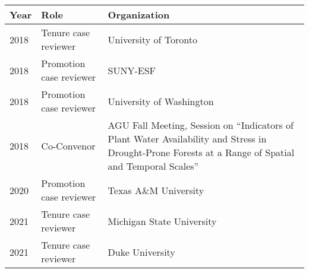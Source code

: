 
\begin{longtable}{llp{12cm}}
Year & Role & Organization\\
\hline 
\endhead 
2018 & Tenure case reviewer & University of Toronto \\
2018 & Promotion case reviewer & SUNY-ESF \\
2018 & Promotion case reviewer & University of Washington \\
2018 & Co-Convenor & AGU Fall Meeting, Session on ``Indicators of Plant Water Availability and Stress in Drought-Prone Forests at a Range of Spatial and Temporal Scales'' \\
2020 & Promotion case reviewer & Texas A\&M University \\
2021 & Tenure case reviewer & Michigan State University \\
2021 & Tenure case reviewer & Duke University \\
\end{longtable}
